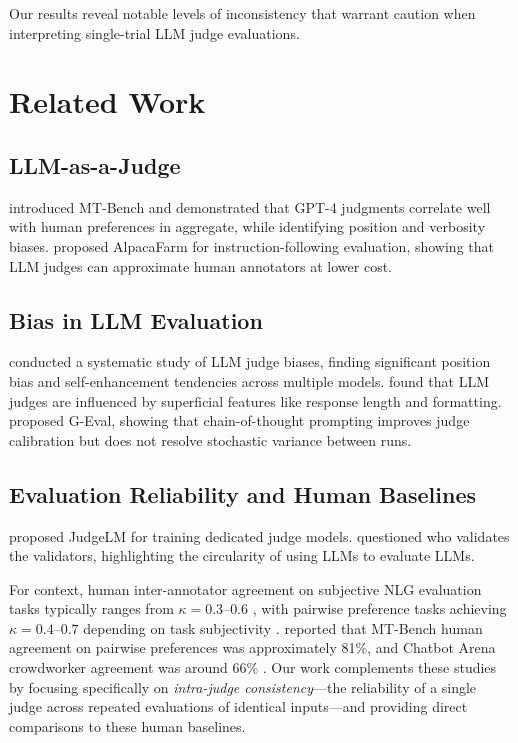 \documentclass{ijclclp}
\begin{document}
Our results reveal notable levels of inconsistency that warrant caution when interpreting single-trial LLM judge evaluations.

\section{Related Work}

\subsection{LLM-as-a-Judge}

\citet{zheng2023judging} introduced MT-Bench and demonstrated that GPT-4 judgments correlate well with human preferences in aggregate, while identifying position and verbosity biases. \citet{dubois2024alpacafarm} proposed AlpacaFarm for instruction-following evaluation, showing that LLM judges can approximate human annotators at lower cost.

\subsection{Bias in LLM Evaluation}

\citet{wang2023large} conducted a systematic study of LLM judge biases, finding significant position bias and self-enhancement tendencies across multiple models. \citet{stureborg2024large} found that LLM judges are influenced by superficial features like response length and formatting. \citet{liu2023geval} proposed G-Eval, showing that chain-of-thought prompting improves judge calibration but does not resolve stochastic variance between runs.

\subsection{Evaluation Reliability and Human Baselines}

\citet{zhu2023judgelm} proposed JudgeLM for training dedicated judge models. \citet{shankar2024validates} questioned who validates the validators, highlighting the circularity of using LLMs to evaluate LLMs.

For context, human inter-annotator agreement on subjective NLG evaluation tasks typically ranges from $\kappa = 0.3$--$0.6$ \citep{amidei2019agreement}, with pairwise preference tasks achieving $\kappa = 0.4$--$0.7$ depending on task subjectivity \citep{clark2021all}. \citet{zheng2023judging} reported that MT-Bench human agreement on pairwise preferences was approximately 81\%, and Chatbot Arena crowdworker agreement was around 66\% \citep{chiang2024chatbot}. Our work complements these studies by focusing specifically on \textit{intra-judge consistency}---the reliability of a single judge across repeated evaluations of identical inputs---and providing direct comparisons to these human baselines.
\end{document}
